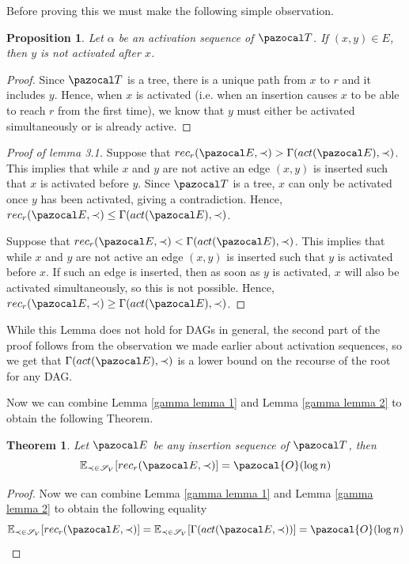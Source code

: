 \documentclass{report}
\newtheorem{theorem}{Theorem}
\newtheorem{proposition}{Proposition}
\begin{document}
Before proving this we must make the following simple observation.

\begin{proposition}
Let $\alpha$ be an activation sequence of $\pazocal T$. If $(x,y) \in E$, then $y$ is not activated after $x$.
\end{proposition}

\begin{proof}
Since $\pazocal T$ is a tree, there is a unique path from $x$ to $r$ and it includes $y$. Hence, when $x$ is activated (i.e. when an insertion causes $x$ to be able to reach $r$ from the first time), we know that $y$ must either be activated simultaneously or is already active.
\end{proof}

\begin{proof}[Proof of lemma 3.1]
Suppose that $rec_r(\pazocal E, \prec) > \Gamma(act(\pazocal E), \prec)$. This implies that while $x$ and $y$ are not active an edge $(x,y)$ is inserted such that $x$ is activated before $y$. Since $\pazocal T$ is a tree, $x$ can only be activated once $y$ has been activated, giving a contradiction. Hence, $rec_r(\pazocal E, \prec) \leq \Gamma(act(\pazocal E), \prec)$.

Suppose that $rec_r(\pazocal E, \prec) < \Gamma(act(\pazocal E), \prec)$. This implies that while $x$ and $y$ are not active an edge $(x,y)$ is inserted such that $y$ is activated before $x$. If such an edge is inserted, then as soon as $y$ is activated, $x$ will also be activated simultaneously, so this is not possible. Hence, $rec_r(\pazocal E, \prec) \geq \Gamma(act(\pazocal E), \prec)$.
\end{proof}

While this Lemma does not hold for DAGs in general, the second part of the proof follows from the observation we made earlier about activation sequences, so we get that $\Gamma(act(\pazocal E), \prec)$ is a lower bound on the recourse of the root for any DAG.

Now we can combine Lemma \ref{gamma lemma 1} and Lemma \ref{gamma lemma 2} to obtain the following Theorem.

\begin{theorem}
Let $\pazocal E$ be any insertion sequence of $\pazocal T$, then
\[ \mathbb{E}_{\prec \in \mathcal{S}_V}[ rec_r(\pazocal E, \prec)] = \pazocal{O}(\log n) \]
\end{theorem}

\begin{proof}
Now we can combine Lemma \ref{gamma lemma 1} and Lemma \ref{gamma lemma 2} to obtain the following equality
\[ \mathbb{E}_{\prec \in \mathcal{S}_V}[ rec_r(\pazocal E, \prec)] = \mathbb{E}_{\prec \in \mathcal{S}_V}[\Gamma(act(\pazocal E, \prec))] = \pazocal{O}(\log n) \]
\end{proof}
\end{document}
